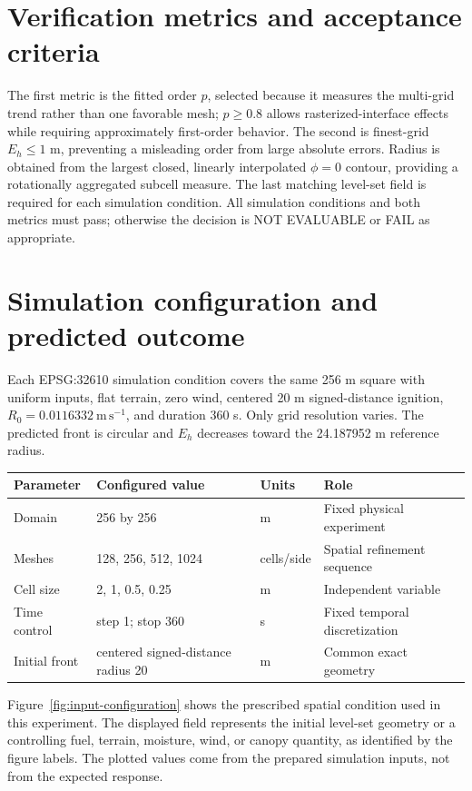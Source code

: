\section{Verification metrics and acceptance criteria}

The first metric is the fitted order \(p\), selected because it measures the multi-grid trend rather than one favorable mesh; \(p\ge0.8\) allows rasterized-interface effects while requiring approximately first-order behavior. The second is finest-grid \(E_h\le1\) m, preventing a misleading order from large absolute errors. Radius is obtained from the largest closed, linearly interpolated \(\phi=0\) contour, providing a rotationally aggregated subcell measure. The last matching level-set field is required for each simulation condition. All simulation conditions and both metrics must pass; otherwise the decision is NOT EVALUABLE or FAIL as appropriate.

\section{Simulation configuration and predicted outcome}

Each EPSG:32610 simulation condition covers the same 256 m square with uniform inputs, flat terrain, zero wind, centered 20 m signed-distance ignition, \(R_0=0.0116332~\mathrm{m\,s^{-1}}\), and duration 360 s. Only grid resolution varies. The predicted front is circular and \(E_h\) decreases toward the 24.187952 m reference radius.

\begin{center}\begin{tabular}{p{}p{}p{}p{}}\toprule
Parameter & Configured value & Units & Role \\
\midrule Domain & 256 by 256 & m & Fixed physical experiment \\
Meshes & 128, 256, 512, 1024 & cells/side & Spatial refinement sequence \\
Cell size & 2, 1, 0.5, 0.25 & m & Independent variable \\
Time control & step 1; stop 360 & s & Fixed temporal discretization \\
Initial front & centered signed-distance radius 20 & m & Common exact geometry \\
\bottomrule\end{tabular}\end{center}

Figure~\ref{fig:input-configuration} shows the prescribed spatial condition used in this experiment. The displayed field represents the initial level-set geometry or a controlling fuel, terrain, moisture, wind, or canopy quantity, as identified by the figure labels. The plotted values come from the prepared simulation inputs, not from the expected response.

